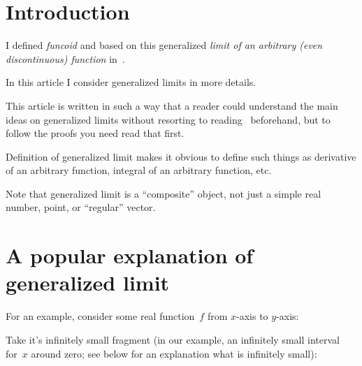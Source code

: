 \chapter{Introduction}

I defined \emph{funcoid} and based on this generalized \emph{limit of an arbitrary (even discontinuous) function} in~\cite{volume-1-edition1}.

In this article I consider generalized limits in more details.

This article is written in such a way that a reader could understand the main ideas on generalized limits without resorting to reading~\cite{volume-1-edition1} beforehand, but to follow the proofs you need read that first.

Definition of generalized limit makes it obvious to define such things as derivative of an arbitrary function, integral of an arbitrary function, etc.

Note that generalized limit is a ``composite'' object, not just a simple real number, point, or ``regular'' vector.

\chapter{A popular explanation of generalized limit}

For an example, consider some real function~$f$ from $x$-axis to $y$-axis:
\begin{figure}[H]
\end{figure}
 
Take it's infinitely small fragment (in our example, an infinitely small interval for~$x$ around zero; see below for an explanation what is infinitely small):
\begin{figure}[H]
\end{figure}

